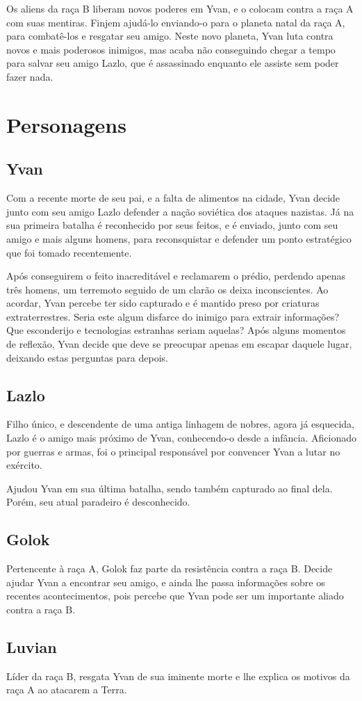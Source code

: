 \documentclass[12pt, a4paper]{article}
\begin{document}
    Os aliens da raça B liberam novos poderes em Yvan, e o colocam contra a raça A
    com suas mentiras. Finjem ajudá-lo enviando-o para o planeta natal da raça A,
    para combatê-los e resgatar seu amigo. Neste novo planeta, Yvan luta contra
    novos e mais poderosos inimigos, mas acaba não conseguindo chegar a tempo para
    salvar seu amigo Lazlo, que é assassinado enquanto ele assiste sem poder fazer
    nada.

\section{Personagens}
    \subsection{Yvan}
        Com a recente morte de seu pai, e a falta de alimentos na cidade, Yvan
        decide junto com seu amigo Lazlo defender a nação soviética dos ataques
        nazistas. Já na sua primeira batalha é reconhecido por seus feitos,
        e é enviado, junto com seu amigo e mais alguns homens, para reconsquistar
        e defender um ponto estratégico que foi tomado recentemente.

        Após conseguirem o feito inacreditável e reclamarem o prédio, perdendo
        apenas três homens, um terremoto seguido de um clarão os deixa inconscientes.
        Ao acordar, Yvan percebe ter sido capturado e é mantido preso por 
        criaturas extraterrestres. Seria este algum disfarce do inimigo para
        extrair informações? Que esconderijo e tecnologias estranhas seriam
        aquelas? Após alguns momentos de reflexão, Yvan decide que deve se 
        preocupar apenas em escapar daquele lugar, deixando estas perguntas
        para depois.

    \subsection{Lazlo}
        Filho único, e descendente de uma antiga linhagem de nobres, agora já
        esquecida, Lazlo é o amigo mais próximo de Yvan, conhecendo-o desde a 
        infância. Aficionado por guerras e armas, foi o principal responsável
        por convencer Yvan a lutar no exército.

        Ajudou Yvan em sua última batalha, sendo também capturado ao final dela.
        Porém, seu atual paradeiro é desconhecido.

    \subsection{Golok}
        Pertencente à raça A, Golok faz parte da resistência contra a raça B. Decide
        ajudar Yvan a encontrar seu amigo, e ainda lhe passa informações sobre
        os recentes acontecimentos, pois percebe que Yvan pode ser um importante
        aliado contra a raça B.

    \subsection{Luvian}
        Líder da raça B, resgata Yvan de sua iminente morte e lhe explica
        os motivos da raça A ao atacarem a Terra.
\end{document}
